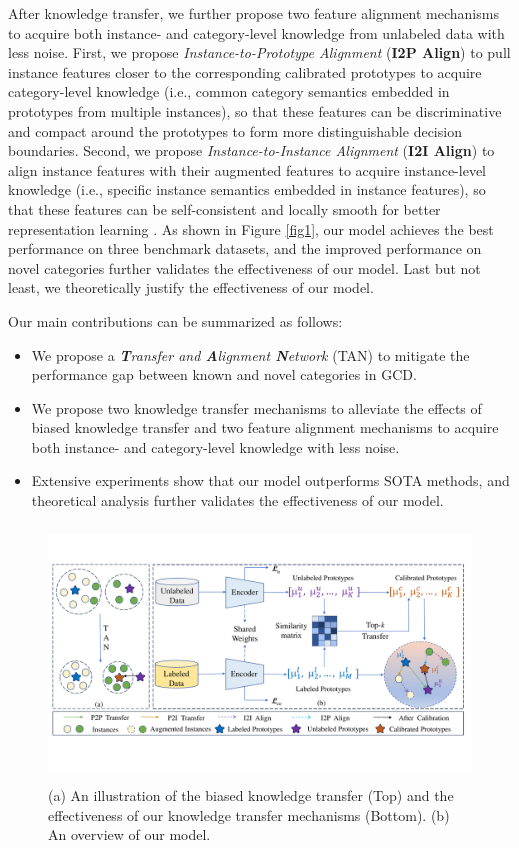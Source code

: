 \documentclass[letterpaper]{article} %
\begin{document}
After knowledge transfer, we further propose two feature alignment mechanisms to acquire both instance- and category-level knowledge from unlabeled data with less noise.
First, we propose \textit{Instance-to-Prototype Alignment} (\textbf{I2P Align}) to pull instance features closer to the corresponding calibrated prototypes to acquire category-level knowledge (i.e., common category semantics embedded in prototypes from multiple instances), so that these features can be discriminative and compact around the prototypes to form more distinguishable decision boundaries. 
Second, we propose \textit{Instance-to-Instance Alignment} (\textbf{I2I Align}) to align instance features with their augmented features to acquire instance-level knowledge (i.e., specific instance semantics embedded in instance features), so that these features can be self-consistent and locally smooth for better representation learning \citep{simclr}.
As shown in Figure \ref{fig1}, our model achieves the best performance on three benchmark datasets, and the improved performance on novel categories further validates the effectiveness of our model. 
Last but not least, we theoretically justify the effectiveness of our model.

Our main contributions can be summarized as follows:
\begin{itemize}
  \item We propose a \textit{\textbf{T}ransfer and \textbf{A}lignment \textbf{N}etwork} (TAN) to mitigate the performance gap between known and novel categories in GCD.
  \item We propose two knowledge transfer mechanisms to alleviate the effects of biased knowledge transfer and two feature alignment mechanisms to acquire both instance- and category-level knowledge with less noise.
  \item Extensive experiments show that our model outperforms SOTA methods, and theoretical analysis further validates the effectiveness of our model.
\end{itemize}


\begin{figure}
\centering
\includegraphics[width=16cm, height=6.8cm]{model_v2.pdf}
\caption{(a) An illustration of the biased knowledge transfer (Top) and the effectiveness of our knowledge transfer mechanisms (Bottom). (b) An overview of our model.} 
\label{fig2}
\end{figure}
\end{document}
